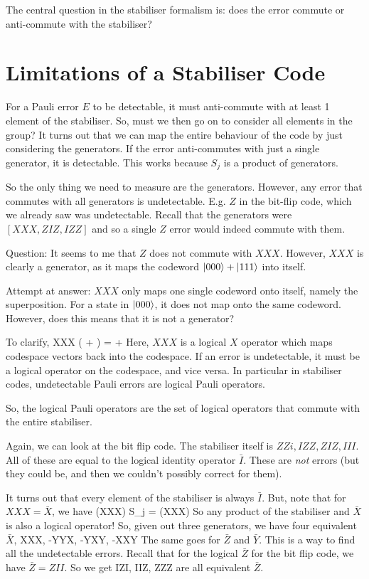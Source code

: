 The central question in the stabiliser formalism is: does the error commute or anti-commute with the stabiliser? 

\section{Limitations of a Stabiliser Code}
For a Pauli error $E$ to be detectable, it must anti-commute with at least 1 element of the stabiliser. So, must we then go on to consider all elements in the group? It turns out that we can map the entire behaviour of the code by just considering the generators. If the error anti-commutes with just a single generator, it is detectable. This works because $S_j$ is a product of generators. 

So the only thing we need to measure are the generators. However, any error that commutes with all generators is undetectable. E.g. $Z$ in the bit-flip code, which we already saw was undetectable. Recall that the generators were $[XXX, ZIZ, IZZ]$ and so a single $Z$ error would indeed commute with them. 

Question: It seems to me that $Z$ does not commute with $XXX$. However, $XXX$ is clearly a generator, as it maps the codeword $\ket{000} + \ket{111}$ into itself. 

Attempt at answer: $XXX$ only maps one single codeword onto itself, namely the superposition. For a state in $\ket{000}$, it does not map onto the same codeword. However, does this means that it is not a generator? 

To clarify, 
\beq
XXX \left( \alpha {} + \beta{} \right) = \alpha {} + \beta {}
\eeq
Here, $XXX$ is a logical $X$ operator which maps codespace vectors back into the codespace. If an error is undetectable, it must be a logical operator on the codespace, and vice versa. In particular in stabiliser codes, undetectable Pauli errors are logical Pauli operators. 

So, the logical Pauli operators are the set of logical operators that commute with the entire stabiliser. 

Again, we can look at the bit flip code. The stabiliser itself is $ZZi, IZZ, ZIZ, III$. All of these are equal to the logical identity operator $\bar{I}$. These are \emph{not} errors (but they could be, and then we couldn't possibly correct for them). 

It turns out that every element of the stabiliser is always $\bar{I}$. But, note that for $XXX = \bar{X}$, we have
\beq
(XXX) S_j \ket{\psi} = (XXX) \ket{\psi}
\eeq
So any product of the stabiliser and $\bar{X}$ is also a logical operator! So, given out three generators, we have four equivalent $\bar{X}$, 
\beq
XXX, -YYX, -YXY, -XXY
\eeq
The same goes for $\bar{Z}$ and $\bar{Y}$. This is a way to find all the undetectable errors. Recall that for the logical $\bar{Z}$ for the bit flip code, we have $\bar{Z} = ZII$. So we get
\beq
IZI, IIZ, ZZZ
\eeq
are all equivalent $\bar{Z}$. 

